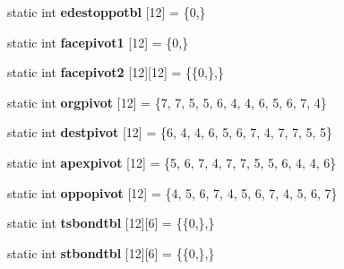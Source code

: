\begin{DoxyCompactItemize}
\item 
\hypertarget{classtetgenmesh_a958c01959dff786bf047d2f270849ffa}{static int {\bfseries edestoppotbl} \mbox{[}12\mbox{]} = \{0,\}}\label{classtetgenmesh_a958c01959dff786bf047d2f270849ffa}

\item 
\hypertarget{classtetgenmesh_af459523fb697a18a4cfd384a15eea491}{static int {\bfseries facepivot1} \mbox{[}12\mbox{]} = \{0,\}}\label{classtetgenmesh_af459523fb697a18a4cfd384a15eea491}

\item 
\hypertarget{classtetgenmesh_abbb55c1b21510a209fd860e8c18a79d1}{static int {\bfseries facepivot2} \mbox{[}12\mbox{]}\mbox{[}12\mbox{]} = \{\{0,\},\}}\label{classtetgenmesh_abbb55c1b21510a209fd860e8c18a79d1}

\item 
\hypertarget{classtetgenmesh_a65e14fb4bf9fa6a240a9441ab73bdec5}{static int {\bfseries orgpivot} \mbox{[}12\mbox{]} = \{7, 7, 5, 5, 6, 4, 4, 6, 5, 6, 7, 4\}}\label{classtetgenmesh_a65e14fb4bf9fa6a240a9441ab73bdec5}

\item 
\hypertarget{classtetgenmesh_a213a06f8f39654014405e4add71073d3}{static int {\bfseries destpivot} \mbox{[}12\mbox{]} = \{6, 4, 4, 6, 5, 6, 7, 4, 7, 7, 5, 5\}}\label{classtetgenmesh_a213a06f8f39654014405e4add71073d3}

\item 
\hypertarget{classtetgenmesh_a0322a7ed3ee115cb852ae8d46e2b261c}{static int {\bfseries apexpivot} \mbox{[}12\mbox{]} = \{5, 6, 7, 4, 7, 7, 5, 5, 6, 4, 4, 6\}}\label{classtetgenmesh_a0322a7ed3ee115cb852ae8d46e2b261c}

\item 
\hypertarget{classtetgenmesh_a6ca1afb964b1b34272d978ddbc0686a9}{static int {\bfseries oppopivot} \mbox{[}12\mbox{]} = \{4, 5, 6, 7, 4, 5, 6, 7, 4, 5, 6, 7\}}\label{classtetgenmesh_a6ca1afb964b1b34272d978ddbc0686a9}

\item 
\hypertarget{classtetgenmesh_a053685b4d9d852983e842a33a95c31e4}{static int {\bfseries tsbondtbl} \mbox{[}12\mbox{]}\mbox{[}6\mbox{]} = \{\{0,\},\}}\label{classtetgenmesh_a053685b4d9d852983e842a33a95c31e4}

\item 
\hypertarget{classtetgenmesh_a8c25d3648eac238fe5cd43ed4b06c040}{static int {\bfseries stbondtbl} \mbox{[}12\mbox{]}\mbox{[}6\mbox{]} = \{\{0,\},\}}\label{classtetgenmesh_a8c25d3648eac238fe5cd43ed4b06c040}


\end{DoxyCompactItemize}
